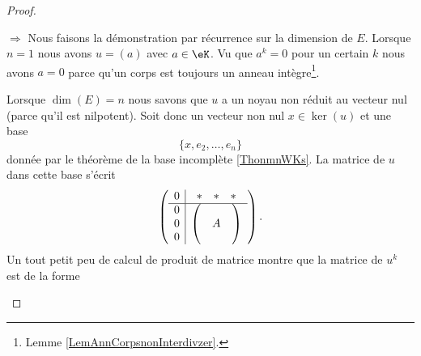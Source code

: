 \begin{proof}
    \begin{subproof}
       \item[\( \Rightarrow\)]
           Nous faisons la démonstration par récurrence sur la dimension de \( E\). Lorsque \( n=1\) nous avons \( u=(a)\) avec \( a\in \eK\). Vu que \( a^k=0\) pour un certain \( k\) nous avons \( a=0\) parce qu'un corps est toujours un anneau intègre\footnote{Lemme \ref{LemAnnCorpsnonInterdivzer}.}. 

           Lorsque \( \dim(E)=n\) nous savons que \( u\) a un noyau non réduit au vecteur nul (parce qu'il est nilpotent). Soit donc un vecteur non nul \( x\in\ker(u)\) et une base
           \begin{equation}
               \{ x,e_2,\ldots, e_n \}
           \end{equation}
           donnée par le théorème de la base incomplète \ref{ThonmnWKs}. La matrice de \( u\) dans cette base s'écrit
           \begin{equation}
               \begin{pmatrix}
                       \begin{array}[]{c|c}
                           0&\begin{matrix} 
                               * &   *    &   *    
                           \end{matrix}\\
                           \hline
                           \begin{matrix}
                               0 \\ 
                               0 \\ 
                               0 
                           \end{matrix}&
                           \begin{pmatrix}
                                &       &       \\
                                &   A    &       \\
                                &       &   
                           \end{pmatrix}
                       \end{array}
               \end{pmatrix}.
           \end{equation}
           Un tout petit peu de calcul de produit de matrice montre que la matrice de \( u^k\) est de la forme
           \begin{equation}

\end{equation}
\end{subproof}
\end{proof}

